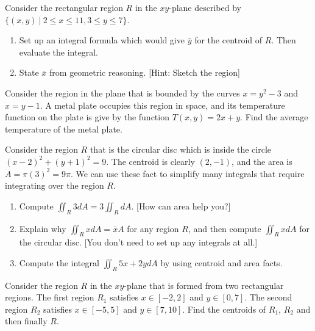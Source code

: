 \begin{problem}
Consider the rectangular region $R$ in the $xy$-plane described by $\{(x,y)\ |\ 2\leq x\leq 11, 3\leq y\leq 7\}$.
\begin{enumerate}
	\item Set up an integral formula which would give $\bar y$ for the centroid of $R$.  Then evaluate the integral.
	\item State $\bar x$ from geometric reasoning. [Hint: Sketch the region]

\end{enumerate}
\end{problem}

\begin{problem}
 Consider the region in the plane that is bounded by the curves $x=y^2-3$ and $x=y-1$.  A metal plate occupies this region in space, and its temperature function on the plate is give by the function $T(x,y)=2x+y$.  Find the average temperature of the metal plate.
\end{problem}

\begin{problem}\label{centroid trick}
Consider the region $R$ that is the circular disc which is inside the circle $(x-2)^2+(y+1)^2=9$. The centroid is clearly $(2,-1)$, and the area is $A=\pi(3)^2=9\pi$.  We can use these fact to simplify many integrals that require integrating over the region $R$.  
\begin{enumerate}
 \item Compute $\iint_R 3dA = 3\iint_RdA$.  [How can area help you?]
 \item Explain why $\iint_R x dA = \bar x A$ for any region $R$, and then compute $\iint_R x dA$ for the circular disc. [You don't need to set up any integrals at all.]
 \item Compute the integral $\iint_R 5x+2y dA$ by using centroid and area facts.
\end{enumerate}
\end{problem}



\begin{problem}
Consider the region $R$ in the $xy$-plane that is formed from two rectangular regions.  The first region $R_1$ satisfies $x\in[-2,2]$ and $y\in[0,7]$.  The second region $R_2$ satisfies $x\in[-5,5]$ and $y\in[7,10]$.  Find the centroids of $R_1$, $R_2$ and then finally $R$.
\end{problem}



